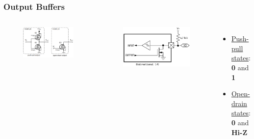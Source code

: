 \begin{frame}
  \frametitle{Output Buffers}
  \begin{columns}
      \vspace*{-2mm}
      \begin{figure}
        \centering
        \includegraphics[scale=5]{images/outputs.png}
      \end{figure}
      \vspace*{-5mm}
      \begin{figure}
        \centering
        \includegraphics[scale=0.25]{images/open-drain-io.png}
      \end{figure}
      \vspace*{-10mm}
      \begin{itemize}
        \item \underline{Push-pull states}: \textbf{0} and \textbf{1}
        \item \underline {Open-drain states}: \textbf{0} and \textbf{Hi-Z}
      \end{itemize}

\end{columns}
\end{frame}
